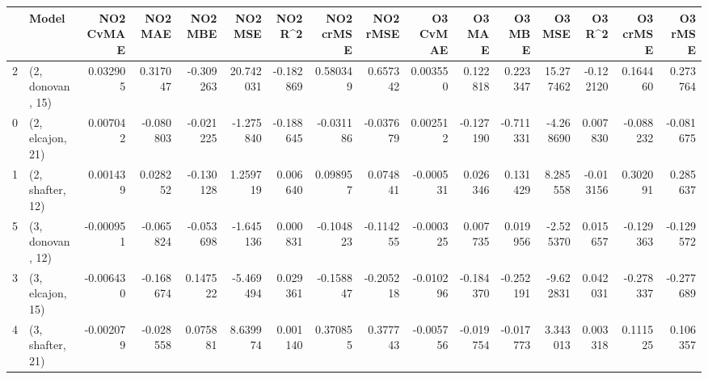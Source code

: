 \begin{tabular}{llrrrrrrrrrrrrrr}
\toprule
{} &             Model &  NO2 CvMAE &   NO2 MAE &   NO2 MBE &    NO2 MSE &   NO2 R\textasciicircum2 &  NO2 crMSE &  NO2 rMSE &  O3 CvMAE &    O3 MAE &    O3 MBE &     O3 MSE &    O3 R\textasciicircum2 &  O3 crMSE &   O3 rMSE \\
\midrule
2 &  (2, donovan, 15) &   0.032905 &  0.317047 & -0.309263 &  20.742031 & -0.182869 &   0.580349 &  0.657342 &  0.003550 &  0.122818 &  0.223347 &  15.277462 & -0.122120 &  0.164460 &  0.273764 \\
0 &  (2, elcajon, 21) &   0.007042 & -0.080803 & -0.021225 &  -1.275840 & -0.188645 &  -0.031186 & -0.037679 &  0.002512 & -0.127190 & -0.711331 &  -4.268690 &  0.007830 & -0.088232 & -0.081675 \\
1 &  (2, shafter, 12) &   0.001439 &  0.028252 & -0.130128 &   1.259719 &  0.006640 &   0.098957 &  0.074841 & -0.000531 &  0.026346 &  0.131429 &   8.285558 & -0.013156 &  0.302091 &  0.285637 \\
5 &  (3, donovan, 12) &  -0.000951 & -0.065824 & -0.053698 &  -1.645136 &  0.000831 &  -0.104823 & -0.114255 & -0.000325 &  0.007735 &  0.019956 &  -2.525370 &  0.015657 & -0.129363 & -0.129572 \\
3 &  (3, elcajon, 15) &  -0.006430 & -0.168674 &  0.147522 &  -5.469494 &  0.029361 &  -0.158847 & -0.205218 & -0.010296 & -0.184370 & -0.252191 &  -9.622831 &  0.042031 & -0.278337 & -0.277689 \\
4 &  (3, shafter, 21) &  -0.002079 & -0.028558 &  0.075881 &   8.639974 &  0.001140 &   0.370855 &  0.377743 & -0.005756 & -0.019754 & -0.017773 &   3.343013 &  0.003318 &  0.111525 &  0.106357 \\
\bottomrule
\end{tabular}
